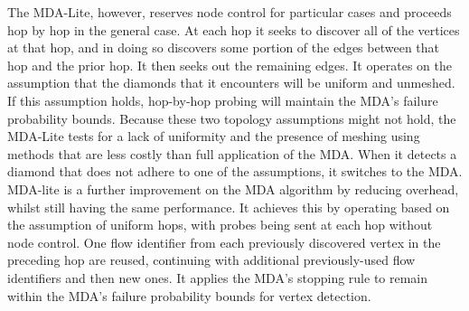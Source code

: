 The MDA-Lite, however, reserves node control for particular cases and proceeds hop by hop in the general case. At each hop it seeks to discover all of the vertices at that hop, and in doing so discovers some portion of the edges between that hop and the prior hop. It then seeks out the remaining edges. It operates on the assumption that the diamonds that it encounters will be uniform and unmeshed. If this assumption holds, hop-by-hop probing will maintain the MDA’s failure probability bounds. Because these two topology assumptions might not hold, the MDA-Lite tests for a lack of uniformity and the presence of meshing using methods that are less costly than full application of the MDA. When it detects a diamond that does not adhere to one of the assumptions, it switches to the MDA.\cite{MDA-lite}
MDA-lite is a further improvement on the MDA algorithm by reducing overhead, whilst still having the same performance. It achieves this by operating based on the assumption of uniform hops, with probes being sent at each hop without node control. One flow identifier from each previously discovered vertex in the preceding hop are reused, continuing with additional previously-used flow identifiers and
then new ones. It applies the MDA’s stopping rule to remain within
the MDA’s failure probability bounds for vertex detection. \cite{MDA-lite}

